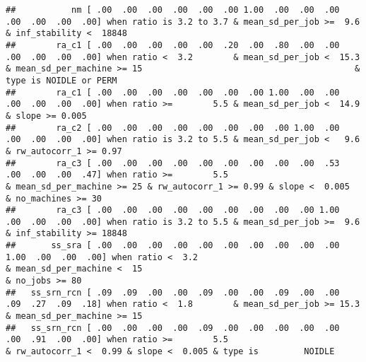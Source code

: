 \documentclass[
]{article}
\begin{document}
\begin{verbatim}
##           nm [ .00  .00  .00  .00  .00  .00 1.00  .00  .00  .00  .00  .00  .00  .00] when ratio is 3.2 to 3.7 & mean_sd_per_job >=  9.6                                                                                                                                   & inf_stability <  18848
##        ra_c1 [ .00  .00  .00  .00  .00  .20  .00  .80  .00  .00  .00  .00  .00  .00] when ratio <  3.2        & mean_sd_per_job <  15.3 & mean_sd_per_machine >= 15                                          & type is NOIDLE or PERM                                                             
##        ra_c1 [ .00  .00  .00  .00  .00  .00  .00 1.00  .00  .00  .00  .00  .00  .00] when ratio >=        5.5 & mean_sd_per_job <  14.9                                                     & slope >= 0.005                                                                                      
##        ra_c2 [ .00  .00  .00  .00  .00  .00  .00  .00 1.00  .00  .00  .00  .00  .00] when ratio is 3.2 to 5.5 & mean_sd_per_job <   9.6                             & rw_autocorr_1 >= 0.97                                                                                                       
##        ra_c3 [ .00  .00  .00  .00  .00  .00  .00  .00  .00  .53  .00  .00  .00  .47] when ratio >=        5.5                           & mean_sd_per_machine >= 25 & rw_autocorr_1 >= 0.99 & slope <  0.005                                          & no_machines >= 30                         
##        ra_c3 [ .00  .00  .00  .00  .00  .00  .00  .00  .00 1.00  .00  .00  .00  .00] when ratio is 3.2 to 5.5 & mean_sd_per_job >=  9.6                                                                                                                                   & inf_stability >= 18848
##       ss_sra [ .00  .00  .00  .00  .00  .00  .00  .00  .00  .00 1.00  .00  .00  .00] when ratio <  3.2                                  & mean_sd_per_machine <  15                                                                   & no_jobs >= 80                                             
##   ss_srn_rcn [ .09  .09  .00  .00  .09  .00  .00  .09  .00  .00  .09  .27  .09  .18] when ratio <  1.8        & mean_sd_per_job >= 15.3 & mean_sd_per_machine >= 15                                                                                                                               
##   ss_srn_rcn [ .00  .00  .00  .00  .09  .00  .00  .00  .00  .00  .00  .91  .00  .00] when ratio >=        5.5                                                       & rw_autocorr_1 <  0.99 & slope <  0.005 & type is         NOIDLE                                                             

\end{verbatim}
\end{document}
